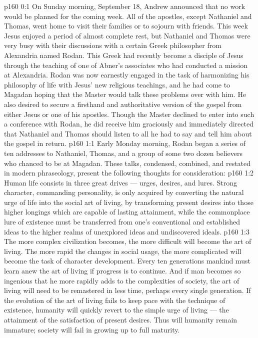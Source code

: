 \author{Midwayer Commission}
\vs p160 0:1 On Sunday morning, September 18, Andrew announced that no work would be planned for the coming week. All of the apostles, except Nathaniel and Thomas, went home to visit their families or to sojourn with friends. This week Jesus enjoyed a period of almost complete rest, but Nathaniel and Thomas were very busy with their discussions with a certain Greek philosopher from Alexandria named Rodan. This Greek had recently become a disciple of Jesus through the teaching of one of Abner’s associates who had conducted a mission at Alexandria. Rodan was now earnestly engaged in the task of harmonizing his philosophy of life with Jesus’ new religious teachings, and he had come to Magadan hoping that the Master would talk these problems over with him. He also desired to secure a firsthand and authoritative version of the gospel from either Jesus or one of his apostles. Though the Master declined to enter into such a conference with Rodan, he did receive him graciously and immediately directed that Nathaniel and Thomas should listen to all he had to say and tell him about the gospel in return.
\vs p160 1:1 Early Monday morning, Rodan began a series of ten addresses to Nathaniel, Thomas, and a group of some two dozen believers who chanced to be at Magadan. These talks, condensed, combined, and restated in modern phraseology, present the following thoughts for consideration:
\vs p160 1:2 \pc Human life consists in three great drives --- urges, desires, and lures. Strong character, commanding personality, is only acquired by converting the natural urge of life into the social art of living, by transforming present desires into those higher longings which are capable of lasting attainment, while the commonplace lure of existence must be transferred from one’s conventional and established ideas to the higher realms of unexplored ideas and undiscovered ideals.
\vs p160 1:3 The more complex civilization becomes, the more difficult will become the art of living. The more rapid the changes in social usage, the more complicated will become the task of character development. Every ten generations mankind must learn anew the art of living if progress is to continue. And if man becomes so ingenious that he more rapidly adds to the complexities of society, the art of living will need to be remastered in less time, perhaps every single generation. If the evolution of the art of living fails to keep pace with the technique of existence, humanity will quickly revert to the simple urge of living --- the attainment of the satisfaction of present desires. Thus will humanity remain immature; society will fail in growing up to full maturity.
